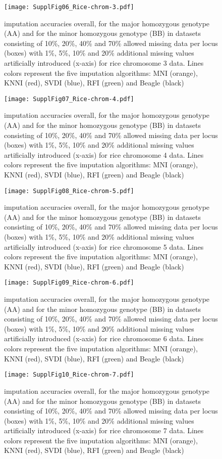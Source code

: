 \begin{figure}\texttt{[image: SupplFig06\_Rice-chrom-3.pdf]}\caption{
imputation accuracies overall, for the major homozygous genotype (AA) and for the minor homozygous genotype (BB) in datasets consisting of
10\%, 20\%, 40\% and 70\% allowed missing data per locus (boxes) with 1\%, 5\%, 10\% and 20\%
additional missing values artificially introduced (x-axis) for rice chromosome 3 data.
Lines colors represent the five imputation algorithms: MNI
(orange), KNNI (red), SVDI (blue), RFI (green) and Beagle (black)}\end{figure}
\begin{figure}\texttt{[image: SupplFig07\_Rice-chrom-4.pdf]}\caption{
imputation accuracies overall, for the major homozygous genotype (AA) and for the minor homozygous genotype (BB) in datasets consisting of
10\%, 20\%, 40\% and 70\% allowed missing data per locus (boxes) with 1\%, 5\%, 10\% and 20\%
additional missing values artificially introduced (x-axis) for rice chromosome 4 data.
Lines colors represent the five imputation algorithms: MNI
(orange), KNNI (red), SVDI (blue), RFI (green) and Beagle (black)}\end{figure}
\begin{figure}\texttt{[image: SupplFig08\_Rice-chrom-5.pdf]}\caption{
imputation accuracies overall, for the major homozygous genotype (AA) and for the minor homozygous genotype (BB) in datasets consisting of
10\%, 20\%, 40\% and 70\% allowed missing data per locus (boxes) with 1\%, 5\%, 10\% and 20\%
additional missing values artificially introduced (x-axis) for rice chromosome 5 data.
Lines colors represent the five imputation algorithms: MNI
(orange), KNNI (red), SVDI (blue), RFI (green) and Beagle (black)}\end{figure}
\begin{figure}\texttt{[image: SupplFig09\_Rice-chrom-6.pdf]}\caption{
imputation accuracies overall, for the major homozygous genotype (AA) and for the minor homozygous genotype (BB) in datasets consisting of
10\%, 20\%, 40\% and 70\% allowed missing data per locus (boxes) with 1\%, 5\%, 10\% and 20\%
additional missing values artificially introduced (x-axis) for rice chromosome 6 data.
Lines colors represent the five imputation algorithms: MNI
(orange), KNNI (red), SVDI (blue), RFI (green) and Beagle (black)}\end{figure}
\begin{figure}\texttt{[image: SupplFig10\_Rice-chrom-7.pdf]}\caption{
imputation accuracies overall, for the major homozygous genotype (AA) and for the minor homozygous genotype (BB) in datasets consisting of
10\%, 20\%, 40\% and 70\% allowed missing data per locus (boxes) with 1\%, 5\%, 10\% and 20\%
additional missing values artificially introduced (x-axis) for rice chromosome 7 data.
Lines colors represent the five imputation algorithms: MNI
(orange), KNNI (red), SVDI (blue), RFI (green) and Beagle (black)}\end{figure}
